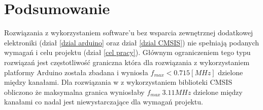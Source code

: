 
\section{Podsumowanie}

Rozwiązania z wykorzystaniem software'u bez wsparcia zewnętrznej dodatkowej elektroniki (dział \ref{dzial arduino} oraz dział \ref{dzial CMSIS}) nie spełniają podanych wymagań i celu projektu (dział \ref{cel pracy}). Głównym ograniczeniem tego typu rozwiązań jest częstotliwość graniczna która dla rozwiązania z wykorzystaniem platformy Arduino została zbadana i wyniosła $f_{max}< 0.715 [MHz]$ dzielone między kanałami. Dla rozwiązania w z wykorzystaniem biblioteki CMSIS obliczono że maksymalna granica wyniosłaby $f_{max} ~ 3.11 MHz$ dzielone między kanałami co nadal jest niewystarczające dla wymagań projektu. 

